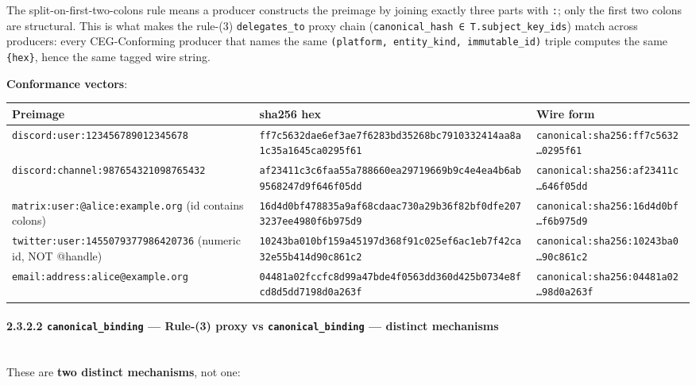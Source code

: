 \documentclass[11pt]{article}
\begin{document}
The split-on-first-two-colons rule means a producer constructs the preimage by joining exactly three parts with \texttt{:}; only the first two colons are structural. This is what makes the rule-(3) \texttt{delegates\_to} proxy chain (\texttt{canonical\_hash ∈ T.subject\_key\_ids}) match across producers: every CEG-Conforming producer that names the same \texttt{(platform, entity\_kind, immutable\_id)} triple computes the same \texttt{\{hex\}}, hence the same tagged wire string.


\textbf{Conformance vectors}:


{\footnotesize
\begin{longtable}{|p{5.33cm}|p{5.33cm}|p{5.33cm}|}\hline
\textbf{Preimage} & \textbf{sha256 hex} & \textbf{Wire form} \\ \hline\endhead
\texttt{discord:user:123456789012345678} & \texttt{ff7c5632dae6ef3ae7f6283bd35268bc7910332414aa8a1c35a1645ca0295f61} & \texttt{canonical:sha256:ff7c5632…0295f61} \\ \hline
\texttt{discord:channel:987654321098765432} & \texttt{af23411c3c6faa55a788660ea29719669b9c4e4ea4b6ab9568247d9f646f05dd} & \texttt{canonical:sha256:af23411c…646f05dd} \\ \hline
\texttt{matrix:user:@alice:example.org} (id contains colons) & \texttt{16d4d0bf478835a9af68cdaac730a29b36f82bf0dfe2073237ee4980f6b975d9} & \texttt{canonical:sha256:16d4d0bf…f6b975d9} \\ \hline
\texttt{twitter:user:1455079377986420736} (numeric id, NOT @handle) & \texttt{10243ba010bf159a45197d368f91c025ef6ac1eb7f42ca32e55b414d90c861c2} & \texttt{canonical:sha256:10243ba0…90c861c2} \\ \hline
\texttt{email:address:alice@example.org} & \texttt{04481a02fccfc8d99a47bde4f0563dd360d425b0734e8fcd8d5dd7198d0a263f} & \texttt{canonical:sha256:04481a02…98d0a263f} \\ \hline
\end{longtable}}


\paragraph{2.3.2.2 \texttt{canonical\_binding} — Rule-(3) proxy vs \texttt{canonical\_binding} — distinct mechanisms}\mbox{}\\


These are \textbf{two distinct mechanisms}, not one:
\end{document}
